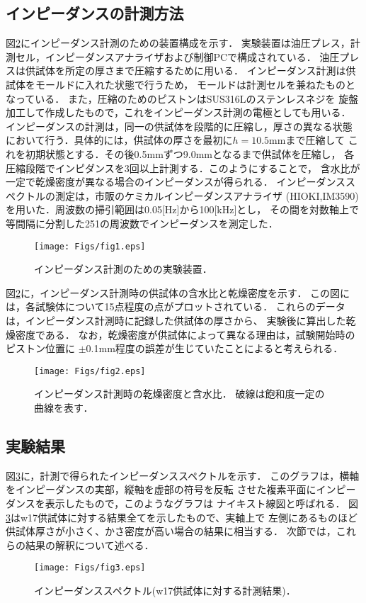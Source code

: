 \documentclass{jsce}
\begin{document}
\subsection{インピーダンスの計測方法}
図\ref{fig:fig2}にインピーダンス計測のための装置構成を示す．
実験装置は油圧プレス，計測セル，インピーダンスアナライザおよび制御PCで構成されている．
油圧プレスは供試体を所定の厚さまで圧縮するために用いる．
インピーダンス計測は供試体をモールドに入れた状態で行うため，
モールドは計測セルを兼ねたものとなっている．
また，圧縮のためのピストンはSUS316Lのステンレスネジを
旋盤加工して作成したもので，これをインピーダンス計測の電極としても用いる．
インピーダンスの計測は，同一の供試体を段階的に圧縮し，厚さの異なる状態
において行う．具体的には，供試体の厚さを最初に$h=10.5$mmまで圧縮して
これを初期状態とする．その後0.5mmずつ9.0mmとなるまで供試体を圧縮し，
各圧縮段階でインピダンスを3回以上計測する．このようにすることで，
含水比が一定で乾燥密度が異なる場合のインピーダンスが得られる．
インピーダンススペクトルの測定は，市販のケミカルインピーダンスアナライザ
(HIOKI,IM3590)を用いた．周波数の掃引範囲は0.05[Hz]から100[kHz]とし，
その間を対数軸上で等間隔に分割した251の周波数でインピーダンスを測定した．
\begin{figure}[h]
	\begin{center}
	\texttt{[image: Figs/fig1.eps]} 
	\end{center}
	\caption{
		インピーダンス計測のための実験装置．
	} 
	\label{fig:fig1}
\end{figure}
図\ref{fig:fig2}に，インピーダンス計測時の供試体の含水比と乾燥密度を示す．
この図には，各試験体について15点程度の点がプロットされている．
これらのデータは，インピーダンス計測時に記録した供試体の厚さから、
実験後に算出した乾燥密度である．
なお，乾燥密度が供試体によって異なる理由は，試験開始時のピストン位置に
$\pm$0.1mm程度の誤差が生じていたことによると考えられる．
\begin{figure}[h]
	\begin{center}
	\texttt{[image: Figs/fig2.eps]} 
	\end{center}
	\caption{
		インピーダンス計測時の乾燥密度と含水比．
		破線は飽和度一定の曲線を表す．
	} 
	\label{fig:fig2}
\end{figure}
\subsection{実験結果}
図\ref{fig:fig3}に，計測で得られたインピーダンススペクトルを示す．
このグラフは，横軸をインピーダンスの実部，縦軸を虚部の符号を反転
させた複素平面にインピーダンスを表示したもので，このようなグラフは
ナイキスト線図と呼ばれる．
図\ref{fig:fig3}はw17供試体に対する結果全てを示したもので、実軸上で
左側にあるものほど供試体厚さが小さく、かさ密度が高い場合の結果に相当する．
次節では，これらの結果の解釈について述べる．
\begin{figure}[h]
	\begin{center}
	\texttt{[image: Figs/fig3.eps]} 
	\end{center}
	\caption{
		インピーダンススペクトル(w17供試体に対する計測結果)．
	} 
	\label{fig:fig3}
\end{figure}
\end{document}
